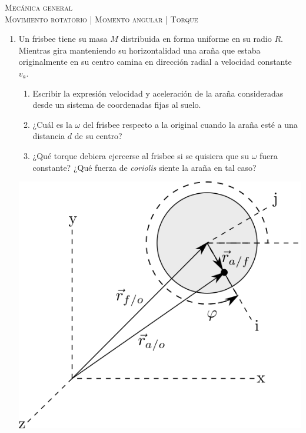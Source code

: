 \documentclass[11pt,spanish,a4paper]{article}
\begin{document}
\begin{center}
  \textsc{\large Mecánica general}\\
  \textsc{\large Movimiento rotatorio | Momento angular | Torque}
\end{center}

\begin{enumerate}


\subsection*{Movimiento rotatorio}

\item
\begin{minipage}[t][6cm]{0.65\textwidth}
Un frisbee tiene su masa $M$ distribuida en forma uniforme en su radio $R$.
Mientras gira manteniendo su horizontalidad una araña que estaba originalmente en su centro camina en dirección radial a velocidad constante $v_a$.
\begin{enumerate}[label=\alph*)]
	\item Escribir la expresión velocidad y aceleración de la araña consideradas desde un sistema de coordenadas fijas al suelo.
	\item ¿Cuál es la $\omega$ del frisbee respecto a la original cuando la araña esté a una distancia $d$ de su centro?
	\item ¿Qué torque debiera ejercerse al frisbee si se quisiera que su $\omega$ fuera constante?
	¿Qué fuerza de \emph{coriolis} siente la araña en tal caso?
\end{enumerate}
\end{minipage}
\begin{minipage}[c][0cm][t]{0.3\textwidth}
	\includegraphics[width=\textwidth]{aranaFrisbee.png}
\end{minipage}



\end{enumerate}
\end{document}

